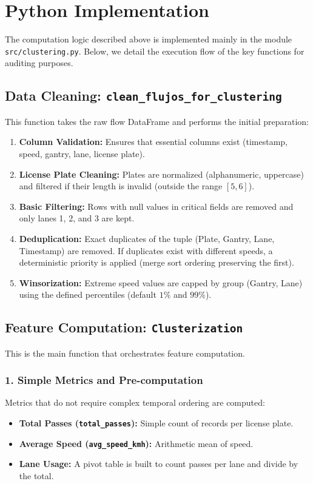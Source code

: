 \section{Python Implementation}
The computation logic described above is implemented mainly in the module \texttt{src/clustering.py}. Below, we detail the execution flow of the key functions for auditing purposes.

\subsection{Data Cleaning: \texttt{clean\_flujos\_for\_clustering}}
This function takes the raw flow DataFrame and performs the initial preparation:
\begin{enumerate}
    \item \textbf{Column Validation:} Ensures that essential columns exist (timestamp, speed, gantry, lane, license plate).
    \item \textbf{License Plate Cleaning:} Plates are normalized (alphanumeric, uppercase) and filtered if their length is invalid (outside the range $[5, 6]$).
    \item \textbf{Basic Filtering:} Rows with null values in critical fields are removed and only lanes 1, 2, and 3 are kept.
    \item \textbf{Deduplication:} Exact duplicates of the tuple (Plate, Gantry, Lane, Timestamp) are removed. If duplicates exist with different speeds, a deterministic priority is applied (merge sort ordering preserving the first).
    \item \textbf{Winsorization:} Extreme speed values are capped by group (Gantry, Lane) using the defined percentiles (default $1\%$ and $99\%$).
\end{enumerate}

\subsection{Feature Computation: \texttt{Clusterization}}
This is the main function that orchestrates feature computation.

\subsubsection{1. Simple Metrics and Pre-computation}
Metrics that do not require complex temporal ordering are computed:
\begin{itemize}
    \item \textbf{Total Passes (\texttt{total\_passes}):} Simple count of records per license plate.
    \item \textbf{Average Speed (\texttt{avg\_speed\_kmh}):} Arithmetic mean of speed.
    \item \textbf{Lane Usage:} A pivot table is built to count passes per lane and divide by the total.
\end{itemize}


